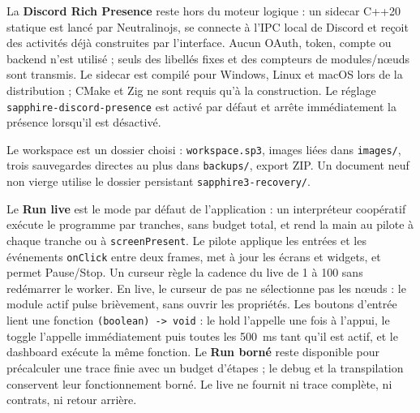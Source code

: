 \documentclass[11pt,a4paper]{article}
\newcommand{\code}[1]{\texttt{#1}}
\begin{document}
La \textbf{Discord Rich Presence} reste hors du moteur logique : un sidecar C++20
statique est lancé par Neutralinojs, se connecte à l'IPC local de Discord et
reçoit des activités déjà construites par l'interface. Aucun OAuth, token,
compte ou backend n'est utilisé ; seuls des libellés fixes et des compteurs de
modules/nœuds sont transmis. Le sidecar est compilé pour Windows, Linux et macOS
lors de la distribution ; CMake et Zig ne sont requis qu'à la construction. Le
réglage \code{sapphire-discord-presence} est activé par défaut et arrête
immédiatement la présence lorsqu'il est désactivé.

Le workspace est un dossier choisi : \code{workspace.sp3}, images liées dans
\code{images/}, trois sauvegardes directes au plus dans \code{backups/}, export ZIP.
Un document neuf non vierge utilise le dossier persistant \code{sapphire3-recovery/}.

Le \textbf{Run live} est le mode par défaut de l'application : un interpréteur
coopératif exécute le programme par tranches, sans budget total, et rend la main
au pilote à chaque tranche ou à \code{screenPresent}. Le pilote applique les entrées
et les événements \code{onClick} entre deux frames, met à jour les écrans et widgets,
et permet Pause/Stop. Un curseur règle la cadence du live de 1 à 100 sans redémarrer
le worker. En live, le curseur de pas ne sélectionne pas les nœuds : le module actif
pulse brièvement, sans ouvrir les propriétés. Les boutons d'entrée lient une fonction
\code{(boolean) -> void} :
le hold l'appelle une fois à l'appui, le toggle l'appelle immédiatement puis toutes
les 500~ms tant qu'il est actif, et le dashboard exécute la même fonction. Le
\textbf{Run borné} reste disponible pour précalculer une trace finie avec un budget
d'étapes ; le debug et la transpilation conservent leur fonctionnement borné.
Le live ne fournit ni trace complète, ni contrats, ni retour arrière.
\end{document}
